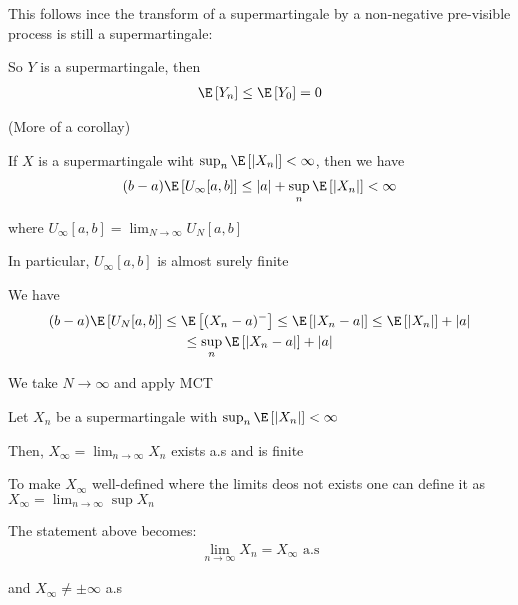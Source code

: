 \par\bigskip
\noindent This follows ince the transform of a supermartingale by a non-negative pre-visible process is still a supermartingale:\par
\noindent So $Y$ is a supermartingale, then 
\begin{equation*}
  \begin{gathered}
    \E\left[Y_n\right]\leq \E\left[Y_0\right]= 0
  \end{gathered}
\end{equation*}
\par\bigskip
\begin{lem}[]{}
  (More of a corollay)\par
  \noindent If $X$ is a supermartingale wiht $\sup_n \E\left[\left|X_n\right|\right]<\infty$, then we have
  \begin{equation*}
    \begin{gathered}
      (b-a)\E\left[U_{\infty}[a,b]\right]\leq \left|a\right|+\sup_n \E\left[\left|X_n\right|\right]<\infty
    \end{gathered}
  \end{equation*}\par
  \noindent where $U_{\infty}[a,b] = \lim_{N\to\infty}U_N[a,b]$
  \par\bigskip
  \noindent In particular, $U_\infty[a,b]$ is almost surely finite
\end{lem}
\par\bigskip
\begin{prf}[]{}
  We have
  \begin{equation*}
    \begin{gathered}
      (b-a)\E\left[U_N[a,b]\right]\leq \E\left[(X_n-a)^-\right]\leq \E\left[\left|X_n-a\right|\right]\leq \E\left[\left|X_n\right|\right]+\left|a\right|\\
      \leq \sup_n\E\left[\left|X_n-a\right|\right]+\left|a\right|
    \end{gathered}
  \end{equation*}\par
  \noindent We take $N\to\infty$ and apply MCT
\end{prf}
\par\bigskip
\begin{theo}{}
  Let $X_n$ be a supermartingale with $\sup_n\E\left[\left|X_n\right|\right]<\infty$\par
  \noindent Then, $X_\infty = \lim_{n\to\infty}X_n$ exists a.s and is finite
  \par\bigskip
  \noindent To make $X_\infty$ well-defined where the limits deos not exists one can define it as $X_\infty = \lim_{n\to\infty}\sup X_n$\par
  \noindent The statement above becomes:
  \begin{equation*}
    \begin{gathered}
      \lim_{n\to\infty}X_n = X_\infty\text{ a.s}
    \end{gathered}
  \end{equation*}\par
  \noindent and $X_\infty\neq\pm\infty$ a.s
\end{theo}
